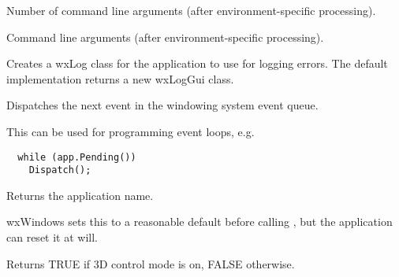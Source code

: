\label{wxappargc}


Number of command line arguments (after environment-specific processing).

\label{wxappargv}


Command line arguments (after environment-specific processing).

\label{wxappcreatelogtarget}


Creates a wxLog class for the application to use for logging errors. The default
implementation returns a new wxLogGui class.



\label{wxappdispatch}


Dispatches the next event in the windowing system event queue.

This can be used for programming event loops, e.g.

\begin{verbatim}
  while (app.Pending())
    Dispatch();
\end{verbatim}



\label{wxappgetappname}


Returns the application name.


wxWindows sets this to a reasonable default before
calling , but the application can reset it at will.

\label{wxappgetauto3d}


Returns TRUE if 3D control mode is on, FALSE otherwise.




